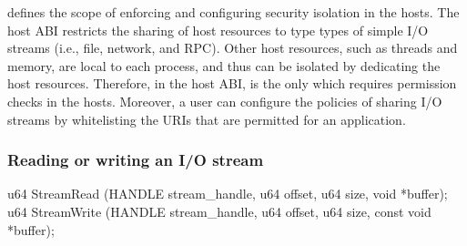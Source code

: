 

 defines the scope of enforcing and configuring security isolation in the hosts.
The host ABI restricts the sharing of host resources
to type types of simple I/O streams (i.e., file, network, and RPC). 
Other host resources, such as threads and memory,
are local to each process, and thus can be isolated by dedicating the host resources.
Therefore, in the host ABI,  is the only \hostapi{}
which requires permission checks in the hosts.
Moreover, a user can configure the policies of sharing I/O streams by
whitelisting the URIs that are permitted for an application.





\subsubsection*{Reading or writing an I/O stream}



\begin{paldef}
u64 StreamRead  (HANDLE stream_handle, u64 offset, u64 size,
                 void *buffer);
u64 StreamWrite (HANDLE stream_handle, u64 offset, u64 size,
                 const void *buffer);
\end{paldef}                   
              
